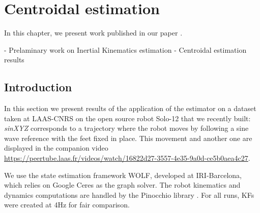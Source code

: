 \chapter{Centroidal estimation}
\label{chp:centroidal_estimation}
\minitoc
\bigskip


In this chapter, we present work published in our paper \cite{fourmy2021contact}.

- Prelaminary work on Inertial Kinematics estimation
- Centroidal estimation results

\section{Introduction}


In this section we present results of the application of the estimator on a dataset taken at LAAS-CNRS on the open source robot Solo-12 
\cite{grimminger2020open} that we recently built:
\textit{sinXYZ} corresponds to a trajectory where the robot moves by following a sine wave reference with the feet fixed in place. 
This movement and another one are displayed in the companion video \url{https://peertube.laas.fr/videos/watch/16822d27-3557-4e35-9a0d-ce5b0aea4c27}.

We use the state estimation framework WOLF, developed at IRI-Barcelona, which relies on Google Ceres \cite{ceres-solver} as the graph solver. 
The robot kinematics and dynamics computations are handled by the Pinocchio library \cite{carpentier2015pinocchio}. For all runs, KFs were created 
at 4Hz for fair comparison.


